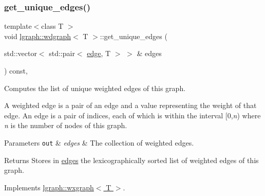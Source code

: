\subsubsection{\texorpdfstring{get\+\_\+unique\+\_\+edges()}{get\_unique\_edges()}\hspace{0.1cm}{\footnotesize\ttfamily [1/2]}}
{\footnotesize\ttfamily template$<$class T $>$ \\
void \hyperlink{classlgraph_1_1wdgraph}{lgraph\+::wdgraph}$<$ T $>$\+::get\+\_\+unique\+\_\+edges (\begin{DoxyParamCaption}\item[{std\+::vector$<$ std\+::pair$<$ \hyperlink{namespacelgraph_a76bd7d50719f03de7a85db259d80d572}{edge}, T $>$ $>$ \&}]{edges }\end{DoxyParamCaption}) const\hspace{0.3cm}{\ttfamily [protected]}, {\ttfamily [virtual]}}



Computes the list of unique weighted edges of this graph. 

A weighted edge is a pair of an edge and a value representing the weight of that edge. An edge is a pair of indices, each of which is within the interval \mbox{[}0,{\itshape n}) where {\itshape n} is the number of nodes of this graph.


\begin{DoxyParams}[1]{Parameters}
\mbox{\tt out}  & {\em edges} & The collection of weighted edges. \\
\hline
\end{DoxyParams}
\begin{DoxyReturn}{Returns}
Stores in \hyperlink{classlgraph_1_1wxgraph_a1b89f56544185e33d54e72a8ed19a789}{edges} the lexicographically sorted list of weighted edges of this graph. 
\end{DoxyReturn}


Implements \hyperlink{classlgraph_1_1wxgraph_a50a9be174538c50c0f2a7ebeaa34ca4d}{lgraph\+::wxgraph$<$ T $>$}.

\mbox{\label{classlgraph_1_1wdgraph_a291ce640bc2273ab23d3d8a545476e7a}} 
